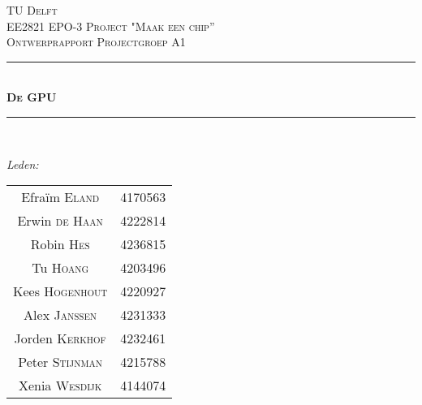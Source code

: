 \documentclass[12pt]{scrreprt}
\begin{document}
\begin{titlepage}

\newcommand{\HRule}{\rule{\linewidth}{0.5mm}} %

\center %
 

\textsc{\LARGE TU Delft}\\[1.5cm] %
\textsc{\Large EE2821 EPO-3 Project "Maak een chip''}\\[0.5cm] %
\textsc{\large Ontwerprapport Projectgroep A1}\\[0.5cm] %


\HRule \\[0.4cm]
\textsc{\huge \bfseries De GPU}\\[0.2cm] %
\HRule \\[1.5cm]
 

\begin{minipage}{0.4\textwidth}
\begin{flushleft} \large
\emph{Leden:}\\
\begin{tabular}{cc}
Efraïm \textsc{Eland} & 4170563 \\
Erwin \textsc{de Haan} & 4222814\\
Robin \textsc{Hes}& 4236815\\
Tu \textsc{Hoang} &4203496 \\
Kees \textsc{Hogenhout} & 4220927\\
Alex \textsc{Janssen} &	4231333\\
Jorden \textsc{Kerkhof} & 4232461\\
Peter \textsc{Stijnman} & 4215788 \\
Xenia \textsc{Wesdijk} & 4144074\\
\end{tabular}


\end{flushleft}
\end{minipage}
\end{titlepage}
\end{document}
